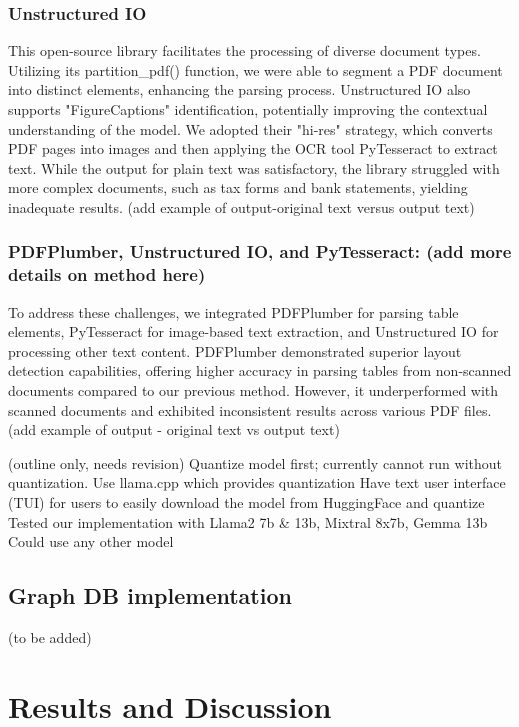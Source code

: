 \documentclass{scrartcl}
\begin{document}
\subsubsection{Unstructured IO} 
This open-source library facilitates the processing of diverse document types. Utilizing its partition_pdf() function, we were able to segment a PDF document into distinct elements, enhancing the parsing process. Unstructured IO also supports "FigureCaptions" identification, potentially improving the contextual understanding of the model. We adopted their "hi-res" strategy, which converts PDF pages into images and then applying the OCR tool PyTesseract to extract text. 
While the output for plain text was satisfactory, the library struggled with more complex documents, such as tax forms and bank statements, yielding inadequate results.
(add example of output-original text versus output text)
\subsubsection{PDFPlumber, Unstructured IO, and PyTesseract: (add more details on method here)}
To address these challenges, we integrated PDFPlumber for parsing table elements, PyTesseract for image-based text extraction, and Unstructured IO for processing other text content. PDFPlumber demonstrated superior layout detection capabilities, offering higher accuracy in parsing tables from non-scanned documents compared to our previous method. However, it underperformed with scanned documents and exhibited inconsistent results across various PDF files.
(add example of output - original text vs output text)

(outline only, needs revision) Quantize model first; currently cannot run without quantization. 
Use llama.cpp which provides quantization 
Have text user interface (TUI) for users to easily download the model from HuggingFace and quantize
Tested our implementation with Llama2 7b & 13b, Mixtral 8x7b, Gemma 13b
Could use any other model

\subsection{Graph DB implementation}
(to be added)
\section{Results and Discussion}
\end{document}
